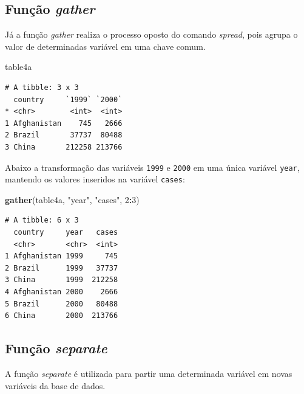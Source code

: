\documentclass[12pt,brazil,oneside]{book}
\newenvironment{Shaded}{\begin{snugshade}}{\end{snugshade}}
\newcommand{\DecValTok}[1]{\textcolor[rgb]{0.00,0.00,0.81}{#1}}
\newcommand{\KeywordTok}[1]{\textcolor[rgb]{0.13,0.29,0.53}{\textbf{#1}}}
\newcommand{\NormalTok}[1]{#1}
\newcommand{\OperatorTok}[1]{\textcolor[rgb]{0.81,0.36,0.00}{\textbf{#1}}}
\newcommand{\StringTok}[1]{\textcolor[rgb]{0.31,0.60,0.02}{#1}}
\begin{document}
\hypertarget{funcao-gather}{%
\subsection{\texorpdfstring{Função \emph{gather}}{Função gather}}\label{funcao-gather}}

Já a função \emph{gather} realiza o processo oposto do comando \emph{spread}, pois agrupa o valor de determinadas variável em uma chave comum.

\begin{Shaded}
\begin{Highlighting}[]
\NormalTok{table4a}
\end{Highlighting}
\end{Shaded}

\begin{verbatim}
# A tibble: 3 x 3
  country     `1999` `2000`
* <chr>        <int>  <int>
1 Afghanistan    745   2666
2 Brazil       37737  80488
3 China       212258 213766
\end{verbatim}

Abaixo a transformação das variáveis \texttt{1999} e \texttt{2000} em uma única variável \texttt{year}, mantendo os valores inseridos na variável \texttt{cases}:

\begin{Shaded}
\begin{Highlighting}[]
\KeywordTok{gather}\NormalTok{(table4a, }\StringTok{"year"}\NormalTok{, }\StringTok{"cases"}\NormalTok{, }\DecValTok{2}\OperatorTok{:}\DecValTok{3}\NormalTok{)}
\end{Highlighting}
\end{Shaded}

\begin{verbatim}
# A tibble: 6 x 3
  country     year   cases
  <chr>       <chr>  <int>
1 Afghanistan 1999     745
2 Brazil      1999   37737
3 China       1999  212258
4 Afghanistan 2000    2666
5 Brazil      2000   80488
6 China       2000  213766
\end{verbatim}

\hypertarget{funcao-separate}{%
\subsection{\texorpdfstring{Função \emph{separate}}{Função separate}}\label{funcao-separate}}

A função \emph{separate} é utilizada para partir uma determinada variável em novas variáveis da base de dados.
\end{document}

